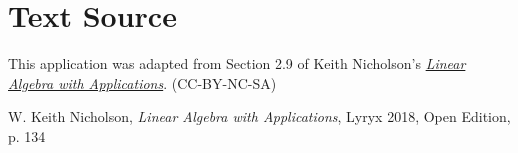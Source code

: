\documentclass{ximera}
\begin{document}
\section*{Text Source} This application was adapted from Section 2.9 of Keith Nicholson's \href{https://open.umn.edu/opentextbooks/textbooks/linear-algebra-with-applications}{\it Linear Algebra with Applications}. (CC-BY-NC-SA)

W. Keith Nicholson, {\it Linear Algebra with Applications}, Lyryx 2018, Open Edition, p. 134 
\end{document}
